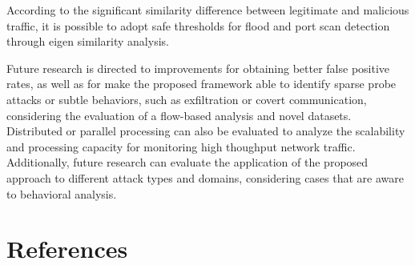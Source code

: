 \documentclass[review]{elsarticle}
\begin{document}
According to the significant similarity difference between legitimate and malicious traffic, it is possible to adopt safe thresholds for flood and port scan detection through eigen similarity analysis.

Future research is directed to improvements for obtaining better false positive rates, as well as for make the proposed framework able to identify sparse probe attacks or subtle behaviors, such as exfiltration or covert communication, considering the evaluation of a flow-based analysis and novel datasets. Distributed or parallel processing can also be evaluated to analyze the scalability and processing capacity for monitoring high thoughput network traffic. Additionally, future research can evaluate the application of the proposed approach to different attack types and domains, considering cases that are aware to behavioral analysis.


\section*{References}


\end{document}
